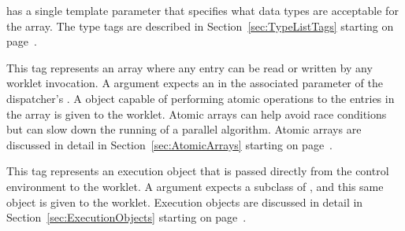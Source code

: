 {   has a single template parameter that specifies
  what data types are acceptable for the array. The type tags are described
  in Section~\ref{sec:TypeListTags} starting on page~\pageref{TypeTagList}.

\item[\sigtag{AtomicArrayInOut}]
  This tag represents an array where any entry can be read or written by any worklet invocation.
  A  argument expects an  in the associated parameter of the dispatcher's .
  A  object capable of performing atomic operations to the entries in the array is given to the worklet.
  Atomic arrays can help avoid race conditions but can slow down the running of a parallel algorithm.
  Atomic arrays are discussed in detail in Section~\ref{sec:AtomicArrays} starting on page~\pageref{sec:AtomicArrays}.

\item[\sigtag{ExecObject}] This tag represents an execution object that is
  passed directly from the control environment to the worklet. A
   argument expects a subclass of
  , and this same object is given to the
  worklet. Execution objects are discussed in detail in
  Section~\ref{sec:ExecutionObjects} starting on
  page~\pageref{sec:ExecutionObjects}.
}

\newcommand{\numericexecutionsignaturetags}{
\item[\sigtagnum{1}, \sigtagnum{2},$\ldots$] These reference the
  corresponding parameter in the \controlsignature.
}

\newcommand{\commonexecutionsignaturetags}{
\item[\sigtag{WorkIndex}]
  This tag produces a \vtkm{Id} that uniquely identifies the invocation of the worklet.
\item[\sigtag{VisitIndex}]
  This tag produces a \vtkm{IdComponent} that uniquely identifies when multiple worklet invocations operate on the same input item, which can happen when defining a worklet with scatter (as described in Section~\ref{sec:WorkletScatter}).
\item[\sigtag{InputIndex}]
  This tag produces a \vtkm{Id} that identifies the index of the input element, which can differ from the \sigtag{WorkIndex} in a worklet with a scatter (as described in Section~\ref{sec:WorkletScatter}).
\item[\sigtag{OutputIndex}]
  This tag produces a \vtkm{Id} that identifies the index of the output element. (This is generally the same as \sigtag{WorkIndex}.)
}

